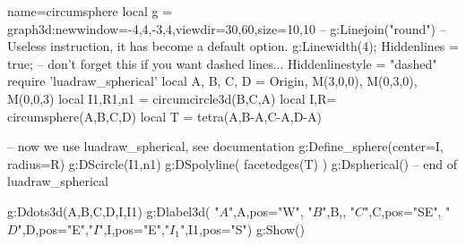 \documentclass[12pt]{standalone}
\begin{document}
\begin{luadraw}{name=circumsphere}
local g = graph3d:new{window={-4,4,-3,4},viewdir={30,60},size={10,10}}
-- g:Linejoin("round") --Useless instruction, it has become a default option.
g:Linewidth(4); 
Hiddenlines = true; -- don't forget this if you want dashed lines...
Hiddenlinestyle = "dashed"
require 'luadraw_spherical'
local A, B, C, D = Origin, M(3,0,0), M(0,3,0), M(0,0,3)
local I1,R1,n1 = circumcircle3d(B,C,A)
local I,R= circumsphere(A,B,C,D)
local T = tetra(A,B-A,C-A,D-A)

-- now we use luadraw_spherical, see documentation
g:Define_sphere({center=I, radius=R}) 
g:DScircle({I1,n1})
g:DSpolyline( facetedges(T) )
g:Dspherical()
-- end of luadraw_spherical

g:Ddots3d({A,B,C,D,I,I1})
g:Dlabel3d( "$A$",A,{pos="W"}, "$B$",B,{}, "$C$",C,{pos="SE"}, "$D$",D,{pos="E"},"$I$",I,{pos="E"},"$I_1$",I1,{pos="S"})
g:Show()
\end{luadraw}
\end{document}
